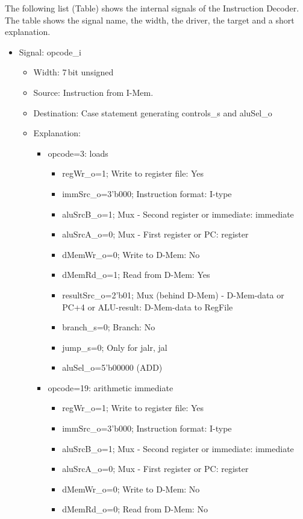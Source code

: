 The following list (Table) shows the internal signals of the Instruction Decoder. The table shows the signal name, the width, the driver, the target and a short explanation.
\begin{itemize}
  \item Signal: opcode\_i
  \begin{itemize}
    \item Width: 7\,bit unsigned
    \item Source: Instruction from I-Mem.
    \item Destination: Case statement generating controls\_s and aluSel\_o
    \item Explanation: 
    \begin{itemize}
      \item opcode=3: loads
      \begin{itemize}
        \item regWr\_o=1; Write to register file: Yes
        \item immSrc\_o=3'b000; Instruction format: I-type
        \item aluSrcB\_o=1; Mux - Second register or immediate: immediate
        \item aluSrcA\_o=0; Mux - First register or PC: register
        \item dMemWr\_o=0; Write to D-Mem: No
        \item dMemRd\_o=1; Read from D-Mem: Yes
        \item resultSrc\_o=2'b01; Mux (behind D-Mem) - D-Mem-data or PC+4 or ALU-result: D-Mem-data to RegFile
        \item branch\_s=0; Branch: No
        \item jump\_s=0; Only for jalr, jal
        \item aluSel\_o=5'b00000 (ADD)
      \end{itemize}
      \item opcode=19: arithmetic immediate
      \begin{itemize}
        \item regWr\_o=1; Write to register file: Yes
        \item immSrc\_o=3'b000; Instruction format: I-type
        \item aluSrcB\_o=1; Mux - Second register or immediate: immediate
        \item aluSrcA\_o=0; Mux - First register or PC: register
        \item dMemWr\_o=0; Write to D-Mem: No
        \item dMemRd\_o=0; Read from D-Mem: No

\end{itemize}
\end{itemize}
\end{itemize}
\end{itemize}
